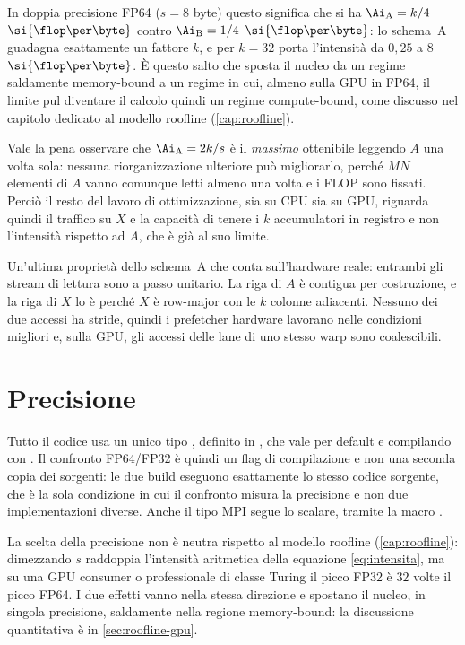 In doppia precisione FP64 ($s = 8$ byte) questo significa che si ha
$\Ai_{\text{A}} = k/4$
$\si{\flop\per\byte}$ contro $\Ai_{\text{B}} = 1/4$
$\si{\flop\per\byte}$: lo schema~A guadagna esattamente un fattore $k$, e per
$k=32$ porta l'intensità da $0{,}25$ a $8$ $\si{\flop\per\byte}$.
È questo salto che sposta il nucleo da un regime saldamente memory-bound a un regime in
cui, almeno sulla GPU in FP64, il limite pul diventare il calcolo quindi un regime compute-bound,
come discusso nel capitolo dedicato al modello roofline
(\cref{cap:roofline}).

\medskip

Vale la pena osservare che $\Ai_{\text{A}} = 2k/s$ è il \emph{massimo}
ottenibile leggendo $A$ una volta sola: nessuna riorganizzazione ulteriore pu\`o
migliorarlo, perch\'e $MN$ elementi di $A$ vanno comunque letti almeno una volta
e i FLOP sono fissati. Perciò il resto del lavoro di ottimizzazione, sia su CPU sia su
GPU, riguarda quindi il traffico su $X$ e la capacità di tenere i $k$
accumulatori in registro e non l'intensità rispetto ad $A$, che è già al
suo limite.

\medskip

Un'ultima proprietà dello schema~A che conta sull'hardware reale: entrambi gli
stream di lettura sono a passo unitario. La riga di $A$ \`e contigua per
costruzione, e la riga di $X$ lo \`e perch\'e $X$ \`e row-major con le $k$ colonne
adiacenti. Nessuno dei due accessi ha stride, quindi i prefetcher hardware
lavorano nelle condizioni migliori e, sulla GPU, gli accessi delle lane di uno
stesso warp sono coalescibili.

\color{black}

\section{Precisione}
\label{sec:precisione}

Tutto il codice usa un unico tipo , definito in
, che vale  per default e 
compilando con . Il confronto FP64/FP32 è quindi un flag di
compilazione e non una seconda copia dei sorgenti: le due build eseguono
esattamente lo stesso codice sorgente, che \`e la sola condizione in cui il
confronto misura la precisione e non due implementazioni diverse.
\color{red}
Anche il tipo
MPI segue lo scalare, tramite la macro .
\color{black}

\color{red}
La scelta della precisione non è neutra rispetto al modello roofline
(\cref{cap:roofline}): dimezzando $s$ raddoppia l'intensità aritmetica della equazione
\ref{eq:intensita}, ma su una GPU consumer o professionale di classe Turing il
picco FP32 è $32$ volte il picco FP64. I due effetti vanno nella stessa
direzione e spostano il nucleo, in singola precisione, saldamente nella regione
memory-bound: la discussione quantitativa \`e in \cref{sec:roofline-gpu}.
\color{black}

